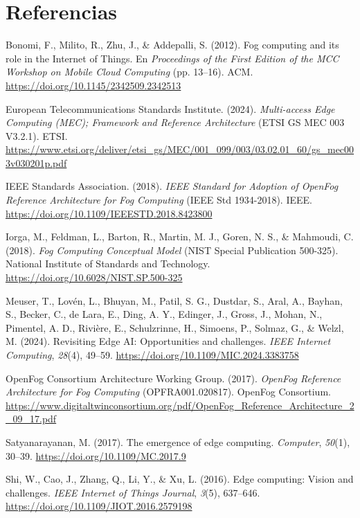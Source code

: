 \newpage
\section{Referencias}

\renewcommand{\refname}{}
\begin{biblio}
    \hypertarget{bonomi2012}{}
    \item Bonomi, F., Milito, R., Zhu, J., \& Addepalli, S. (2012). Fog computing and its role in the Internet of Things. En \textit{Proceedings of the First Edition of the MCC Workshop on Mobile Cloud Computing} (pp. 13--16). ACM. \url{https://doi.org/10.1145/2342509.2342513}
    \hypertarget{etsi2024}{}
    \item European Telecommunications Standards Institute. (2024). \textit{Multi-access Edge Computing (MEC); Framework and Reference Architecture} (ETSI GS MEC 003 V3.2.1). ETSI. \url{https://www.etsi.org/deliver/etsi_gs/MEC/001_099/003/03.02.01_60/gs_mec003v030201p.pdf}
    \hypertarget{ieee2018}{}
    \item IEEE Standards Association. (2018). \textit{IEEE Standard for Adoption of OpenFog Reference Architecture for Fog Computing} (IEEE Std 1934-2018). IEEE. \url{https://doi.org/10.1109/IEEESTD.2018.8423800}
    \hypertarget{iorga2018}{}
    \item Iorga, M., Feldman, L., Barton, R., Martin, M. J., Goren, N. S., \& Mahmoudi, C. (2018). \textit{Fog Computing Conceptual Model} (NIST Special Publication 500-325). National Institute of Standards and Technology. \url{https://doi.org/10.6028/NIST.SP.500-325}
    \hypertarget{meuser2024}{}
    \item Meuser, T., Lovén, L., Bhuyan, M., Patil, S. G., Dustdar, S., Aral, A., Bayhan, S., Becker, C., de Lara, E., Ding, A. Y., Edinger, J., Gross, J., Mohan, N., Pimentel, A. D., Rivière, E., Schulzrinne, H., Simoens, P., Solmaz, G., \& Welzl, M. (2024). Revisiting Edge AI: Opportunities and challenges. \textit{IEEE Internet Computing}, \textit{28}(4), 49--59. \url{https://doi.org/10.1109/MIC.2024.3383758}
    \hypertarget{openfog2017}{}
    \item OpenFog Consortium Architecture Working Group. (2017). \textit{OpenFog Reference Architecture for Fog Computing} (OPFRA001.020817). OpenFog Consortium. \url{https://www.digitaltwinconsortium.org/pdf/OpenFog_Reference_Architecture_2_09_17.pdf}
    \hypertarget{satyanarayanan2017}{}
    \item Satyanarayanan, M. (2017). The emergence of edge computing. \textit{Computer}, \textit{50}(1), 30--39. \url{https://doi.org/10.1109/MC.2017.9}
    \hypertarget{shi2016}{}
    \item Shi, W., Cao, J., Zhang, Q., Li, Y., \& Xu, L. (2016). Edge computing: Vision and challenges. \textit{IEEE Internet of Things Journal}, \textit{3}(5), 637--646. \url{https://doi.org/10.1109/JIOT.2016.2579198}
\end{biblio}